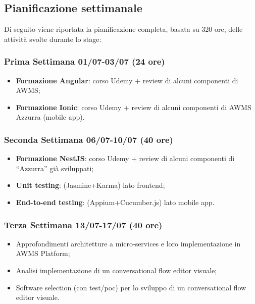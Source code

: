 \subsection{Pianificazione settimanale}
Di seguito viene riportata la pianificazione completa, basata su 320 ore, delle attività svolte durante lo stage:
\begin{trivlist}
	\item \subsubsection{Prima Settimana 01/07-03/07 (24 ore)}   
	\begin{itemize}
		\item \textbf{Formazione Angular}: corso Udemy + review di alcuni componenti di \gls{AWMS}\ap{[G]};
		\item \textbf{Formazione Ionic}: corso Udemy + review di alcuni componenti di \gls{AWMS}\ap{[G]} Azzurra (mobile app).
	\end{itemize}  

\item \subsubsection{Seconda Settimana 06/07-10/07 (40 ore)}
\begin{itemize}
	\item \textbf{Formazione NestJS}: corso Udemy + review di alcuni componenti di “Azzurra” già sviluppati;
	\item \textbf{Unit testing}: (Jasmine+Karma) lato frontend;
	\item \textbf{End-to-end testing}: (Appium+Cucumber.js) lato mobile app.
\end{itemize}

\item \subsubsection{Terza Settimana 13/07-17/07 (40 ore)}
\begin{itemize}
	\item Approfondimenti architetture a micro-services e loro implementazione in \gls{AWMS}\ap{[G]} Platform;
	\item Analisi implementazione di un conversational flow editor visuale;
	\item Software selection (con test/poc) per lo sviluppo di un conversational flow editor visuale.
\end{itemize}	


\end{trivlist}
